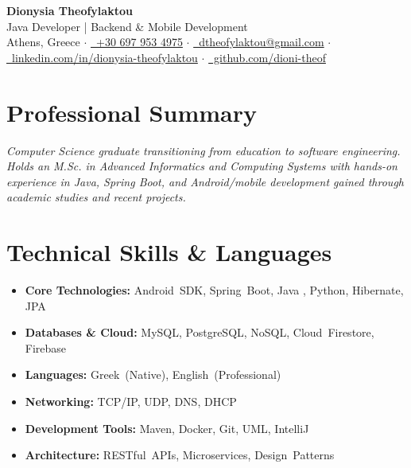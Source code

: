 \documentclass[a4paper,10.5pt]{article}
\begin{document}
\begin{center}
    {\Huge\bfseries\color{primary} Dionysia Theofylaktou}\\[0.15em]
    {\large\color{secondary} Java Developer | Backend \& Mobile Development}\\[0.25em]
    \textcolor{secondary}{
        Athens, Greece $\cdot$
        \href{tel:+306979534975}{\faPhone~+30 697 953 4975} $\cdot$
        \href{mailto:dtheofylaktou@gmail.com}{\faEnvelope~dtheofylaktou@gmail.com} $\cdot$
        \href{https://www.linkedin.com/in/dionysia-theofylaktou/}{\faLinkedin~linkedin.com/in/dionysia-theofylaktou} $\cdot$
        \href{https://github.com/dioni-theof}{\faGithub~github.com/dioni-theof}
    }
\end{center}

\vspace{0.15em}

\section*{Professional Summary}
\textit{Computer Science graduate transitioning from education to software engineering. Holds an M.Sc. in Advanced Informatics and Computing Systems with hands-on experience in Java, Spring Boot, and Android/mobile development gained through academic studies and recent projects.}

\vspace{0.2em}

\section*{Technical Skills \& Languages}
\noindent
\begin{minipage}[t]{0.49\textwidth}
\begin{itemize}[leftmargin=*, noitemsep, topsep=0pt, parsep=1pt, partopsep=0pt]
    \item \textbf{Core Technologies:} Android~SDK, Spring~Boot, Java , Python, Hibernate, JPA
    \item \textbf{{Databases \& Cloud:}} MySQL, PostgreSQL, NoSQL, Cloud~Firestore, Firebase
    \item \textbf{{Languages:}} Greek~(Native), English~(Professional)
\end{itemize}
\end{minipage}\hfill
\begin{minipage}[t]{0.49\textwidth}
\begin{itemize}[leftmargin=*, noitemsep, topsep=0pt, parsep=1pt, partopsep=0pt]
    \item \textbf{{Networking:}} TCP/IP, UDP, DNS, DHCP
    \item \textbf{{Development Tools:}} Maven, Docker, Git, UML, IntelliJ
    \item \textbf{{Architecture:}} RESTful~APIs, Microservices, Design~Patterns
\end{itemize}
\end{minipage}
\end{document}
